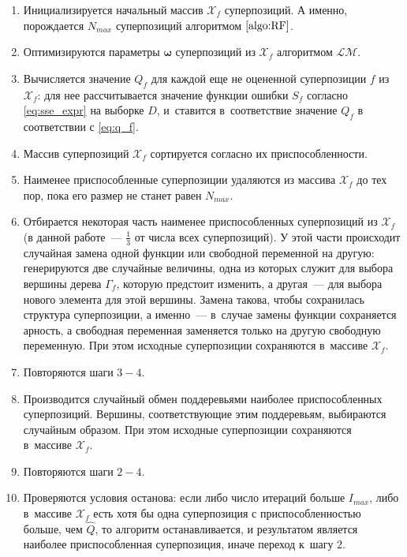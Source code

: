 \documentclass[12pt,a4paper]{amsart}
\begin{document}
\begin{enumerate}
  \item Инициализируется начальный массив $\mathcal{X}_f$ суперпозиций.
	А именно, порождается $N_{max}$ суперпозиций алгоритмом $\ref{algo:RF}$.
  \item Оптимизируются параметры $\boldsymbol{\omega}$ суперпозиций
	из $\mathcal{X}_f$ алгоритмом $\mathcal{LM}$.
  \item Вычисляется значение $Q_f$ для каждой еще не оцененной суперпозиции $f$ из
	$\mathcal{X}_f$: для нее рассчитывается значение функции ошибки $S_f$
	согласно \eqref{eq:sse_expr} на выборке $D$, и~ставится в~соответствие
	значение $Q_f$ в соответствии с \eqref{eq:q_f}.
  \item Массив суперпозиций $\mathcal{X}_f$ сортируется согласно их
	приспособленности.
  \item Наименее приспособленные суперпозиции удаляются из массива
	$\mathcal{X}_f$ до тех пор, пока его размер не станет равен $N_{max}$.
  \item Отбирается некоторая часть наименее приспособленных суперпозиций из
	$\mathcal{X}_f$ (в данной работе~--- $\frac{1}{3}$ от числа всех суперпозиций).
	У этой части происходит случайная замена одной функции
	или свободной переменной на другую: генерируются две случайные величины,
	одна из которых служит для выбора вершины дерева $\Gamma_f$, которую
	предстоит изменить, а другая~--- для выбора нового элемента для этой вершины.
	Замена такова, чтобы сохранилась структура суперпозиции, а именно~---
	в~случае замены функции сохраняется арность, а свободная переменная
	заменяется только на другую свободную переменную. При этом исходные
	суперпозиции сохраняются в~массиве $\mathcal{X}_f$.
  \item Повторяются шаги $3-4$.
  \item Производится случайный обмен поддеревьями наиболее приспособленных
	суперпозиций. Вершины, соответствующие этим поддеревьям, выбираются
	случайным образом. При этом исходные суперпозиции сохраняются в~массиве
	$\mathcal{X}_f$.
  \item Повторяются шаги $2-4$.
  \item Проверяются условия останова: если либо число итераций больше
	$I_{max}$, либо в~массиве $\mathcal{X}_f$ есть хотя бы одна суперпозиция с
	приспособленностью больше, чем $\hat{Q}$, то алгоритм останавливается,
	и результатом является наиболее приспособленная суперпозиция, иначе
	переход к~шагу $2$.
\end{enumerate}
\end{document}

